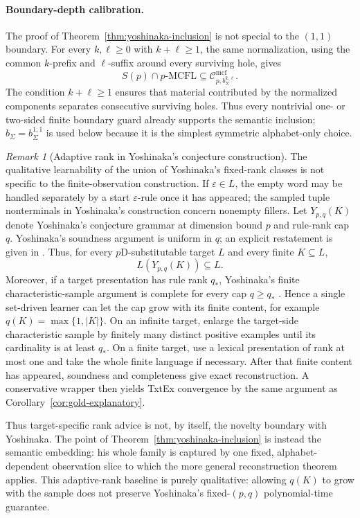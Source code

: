 \documentclass[11pt,a4paper]{article}
\numberwithin{equation}{section}
\theoremstyle{plain}
\theoremstyle{definition}
\theoremstyle{remark}
\newtheorem{remark}[theorem]{Remark}
\newcommand{\Cmcf}[2]{\mathcal{C}^{\mathrm{mcf}}_{#1,#2}}
\newcommand{\eps}{\varepsilon}
\begin{document}
\paragraph{Boundary-depth calibration.}
The proof of Theorem~\ref{thm:yoshinaka-inclusion} is not special to the
\((1,1)\) boundary.  For every $k,\ell\ge0$ with $k+\ell\ge1$, the same
normalization, using the common $k$-prefix and $\ell$-suffix around every
surviving hole, gives
\[
  S(p)\cap p\text{-}\mathrm{MCFL}
  \subseteq \Cmcf{p}{b_\Sigma^{k,\ell}}.
\]
The condition $k+\ell\ge1$ ensures that material contributed by the normalized
components separates consecutive surviving holes.  Thus every nontrivial
one- or two-sided finite boundary guard already supports the semantic
inclusion; $b_\Sigma=b_\Sigma^{1,1}$ is used below because it is the simplest
symmetric alphabet-only choice.

\begin{remark}[Adaptive rank in Yoshinaka's conjecture construction]
\label{rem:yoshinaka-adaptive-rank}
The qualitative learnability of the union of Yoshinaka's fixed-rank classes is
not specific to the finite-observation construction.  If $\eps\in L$, the empty
word may be handled separately by a start $\eps$-rule once it has appeared; the
sampled tuple nonterminals in Yoshinaka's construction concern nonempty fillers.
Let $Y_{p,q}(K)$ denote
Yoshinaka's conjecture grammar at dimension bound $p$ and rule-rank cap $q$.
Yoshinaka's soundness argument is uniform in $q$; an explicit restatement is
given in \cite[Proposition~1]{CaseYoshinakaZeugmann2013}.  Thus, for every
$p$D-substitutable target $L$ and every finite $K\subseteq L$,
\[
  L(Y_{p,q}(K))\subseteq L.
\]
Moreover, if a target presentation has rule rank $q_*$, Yoshinaka's finite
characteristic-sample argument is complete for every cap $q\ge q_*$
\cite{Yoshinaka2011,CaseYoshinakaZeugmann2013}.  Hence a
single set-driven learner can let the cap grow with its finite content, for
example $q(K)=\max\{1,|K|\}$.  On an infinite target, enlarge the target-side
characteristic sample by finitely many distinct positive examples until its
cardinality is at least $q_*$.  On a finite target, use a lexical presentation
of rank at most one and take the whole finite language if necessary.  After
that finite content has appeared, soundness and completeness give exact
reconstruction.  A conservative wrapper then yields TxtEx convergence by the
same argument as Corollary~\ref{cor:gold-explanatory}.

Thus target-specific rank advice is not, by itself, the novelty boundary with
Yoshinaka.  The point of Theorem~\ref{thm:yoshinaka-inclusion} is instead the
semantic embedding: his whole family is captured by one fixed,
alphabet-dependent observation slice to which the more general reconstruction
theorem applies.  This adaptive-rank baseline is purely qualitative: allowing
$q(K)$ to grow with the sample does not preserve Yoshinaka's fixed-$(p,q)$
polynomial-time guarantee.
\end{remark}
\end{document}
